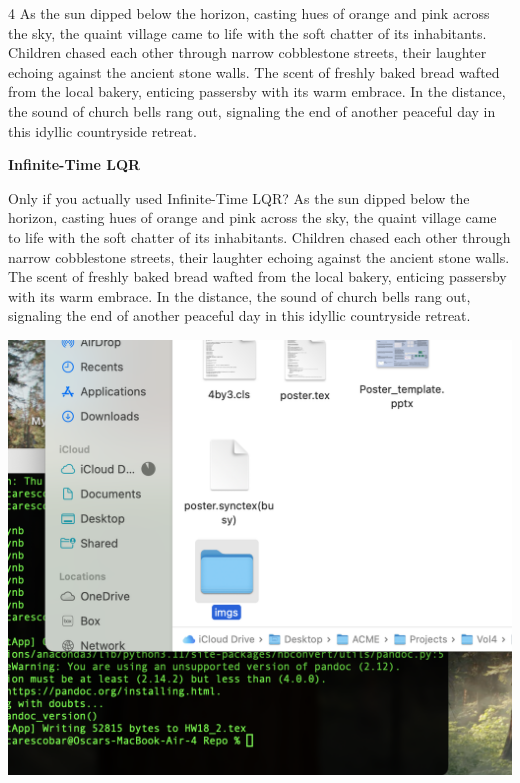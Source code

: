 \documentclass[a0]{4by3}
\newcommand{\NumColumns}{4}
\begin{document}
\begin{minipage}{\linewidth + 2\fboxsep}
\begin{multicols*}{\NumColumns}
            As the sun dipped below the horizon, casting hues of orange and pink across the sky, the quaint village came to life with the soft chatter of its inhabitants. Children chased each other through narrow cobblestone streets, their laughter echoing against the ancient stone walls. The scent of freshly baked bread wafted from the local bakery, enticing passersby with its warm embrace. In the distance, the sound of church bells rang out, signaling the end of another peaceful day in this idyllic countryside retreat.


        \columnbreak
        \begin{center}
        \LARGE{\textbf{Infinite-Time LQR}}
        \end{center}

            Only if you actually used Infinite-Time LQR?
As the sun dipped below the horizon, casting hues of orange and pink across the sky, the quaint village came to life with the soft chatter of its inhabitants. Children chased each other through narrow cobblestone streets, their laughter echoing against the ancient stone walls. The scent of freshly baked bread wafted from the local bakery, enticing passersby with its warm embrace. In the distance, the sound of church bells rang out, signaling the end of another peaceful day in this idyllic countryside retreat.


    
        \begin{center}
          \includegraphics[width=1\linewidth,trim={0 8cm 0 10cm},clip]{./imgs/img.png}
        \end{center}
        

\end{multicols*}
\end{minipage}
\end{document}
